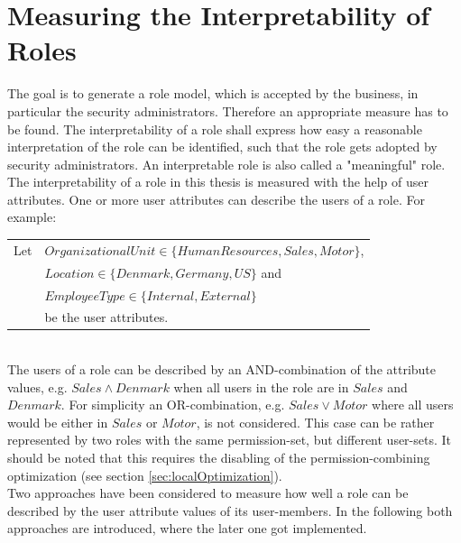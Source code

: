     \section{Measuring the Interpretability of Roles}
    \label{sec:meaningfulness}
    The goal is to generate a role model, which is accepted by the business, in particular the security administrators. Therefore an appropriate measure has to be found. The interpretability of a role shall express how easy a reasonable interpretation of the role can be identified, such that the role gets adopted by security administrators. An interpretable role is also called a "meaningful" role.\\
    The interpretability of a role in this thesis is measured with the help of user attributes. One or more user attributes can describe the users of a role. For example:\\
    \begin{listliketab}
        \begin{tabular}{ll}
            Let     &  $OrganizationalUnit \in \{HumanResources, Sales, Motor\}$,\\
                    &  $Location \in \{Denmark, Germany, US\}$ and\\
                    &  $EmployeeType \in \{Internal, External\}$\\
                    &  be the user attributes.  
        \end{tabular}
    \end{listliketab}\\
    The users of a role can be described by an AND-combination of the attribute values, e.g. $Sales \wedge Denmark$ when all users in the role are in $Sales$ and $Denmark$. For simplicity an OR-combination, e.g. $Sales \vee Motor$ where all users would be either in $Sales$ or $Motor$, is not considered. This case can be rather represented by two roles with the same permission-set, but different user-sets. It should be noted that this requires the disabling of the permission-combining optimization (see section \ref{sec:localOptimization}).\\

    Two approaches have been considered to measure how well a role can be described by the user attribute values of its user-members. In the following both approaches are introduced, where the later one got implemented.\\
    
